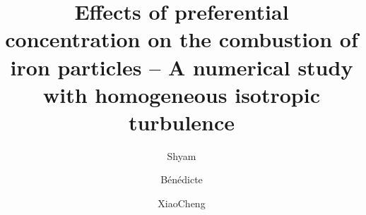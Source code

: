\documentclass[times,twocolumn,final]{elsarticle}
\begin{document}

\begin{frontmatter}

\title{Effects of preferential concentration on the combustion of iron particles – A numerical study with homogeneous
isotropic turbulence}%

\author[1,2]{Shyam }
    
\author[1]{B\'en\'edicte }  
\author[1,2]{XiaoCheng }

\address[1]{Department of Mechanical Engineering, Eindhoven University of Technology, P.O. Box 513, 5600MB, Eindhoven, The Netherlands}
\address[2]{Eindhoven Institute of Renewable Energy Systems, P.O. Box 513, 5600MB, Eindhoven, The Netherlands}

\begin{abstract}


\end{abstract}
\end{frontmatter}
\end{document}
